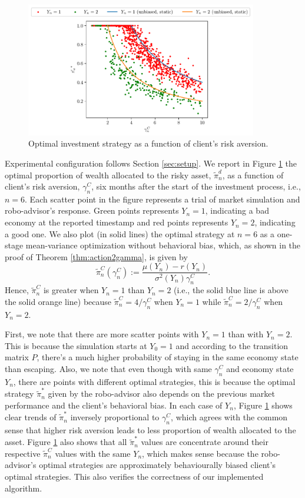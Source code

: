 \begin{figure}[t]
    \centering
    \includegraphics[width=0.9\textwidth]{imgs/optimal_strategy.pdf}
    \caption{Optimal investment strategy as a function of client's risk aversion.}
    \label{fig:opt}
\end{figure}

Experimental configuration follows Section \ref{sec:setup}. We report in Figure \ref{fig:opt} the optimal proportion of wealth allocated to the risky asset, $\tilde\pi_n^d$, as a function of client's risk aversion, $\gamma_n^C$, six months after the start of the investment process, i.e., $n=6$. Each scatter point in the figure represents a trial of market simulation and robo-advisor's response. Green points represents $Y_n=1$, indicating a bad economy at the reported timestamp and red points represents $Y_n=2$, indicating a good one. We also plot (in solid lines) the optimal strategy at $n=6$ as a one-stage mean-variance optimization without behavioral bias, which, as shown in the proof of Theorem \ref{thm:action2gamma}, is given by $$\tilde\pi_n^{C}(\gamma_n^C):=\frac{\mu(Y_n)-r(Y_n)}{\sigma^2(Y_n)\gamma_n^C}.$$ Hence, $\tilde\pi_n^C$ is greater when $Y_n=1$ than $Y_n=2$ (i.e., the solid blue line is above the solid orange line) because $\tilde\pi_n^C=4/\gamma_n^C$ when $Y_n=1$ while $\tilde\pi_n^C=2/\gamma_n^C$ when $Y_n=2$.

First, we note that there are more scatter points with $Y_n=1$ than with $Y_n=2$. This is because the simulation starts at $Y_0=1$ and according to the transition matrix $P$, there's a much higher probability of staying in the same economy state than escaping. Also, we note that even though with same $\gamma_n^C$ and economy state $Y_n$, there are points with different optimal strategies, this is because the optimal strategy $\tilde\pi_n^*$ given by the robo-advisor also depends on the previous market performance and the client's behavioral bias. In each case of $Y_n$, Figure \ref{fig:opt} shows clear trends of $\tilde\pi_n^*$ inversely proportional to $\gamma_n^C$, which agrees with the common sense that higher risk aversion leads to less proportion of wealth allocated to the asset. Figure \ref{fig:opt} also shows that all $\tilde\pi_n^*$ values are concentrate around their respective $\tilde\pi_n^C$ values with the same $Y_n$, which makes sense because the robo-advisor's optimal strategies are approximately behaviourally biased client's optimal strategies. This also verifies the correctness of our implemented algorithm.


